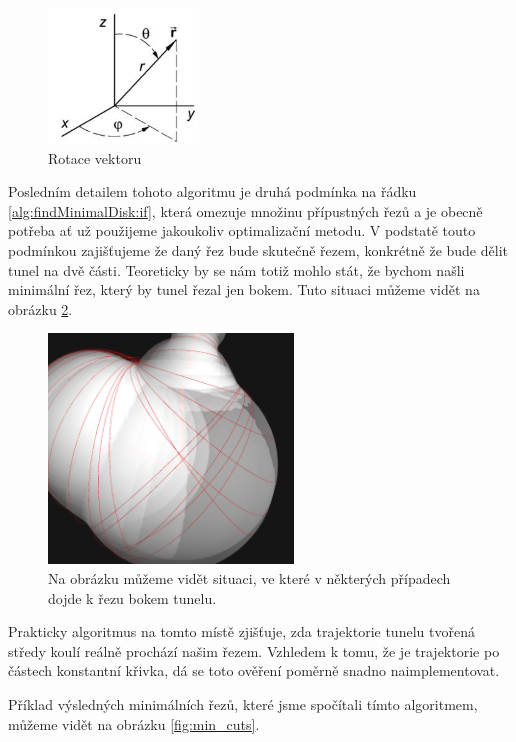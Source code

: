 \begin{figure}[ht]
    \centering
    \includegraphics[width=40mm]{img/vector_rotate.jpg}
    \caption{Rotace vektoru}
  \centering
  \label{fig:vector_rotate}
\end{figure}

Posledním detailem tohoto algoritmu je druhá podmínka na řádku \ref{alg:findMinimalDisk:if},
která omezuje množinu přípustných řezů a je obecně potřeba ať už použijeme
jakoukoliv optimalizační metodu. V podstatě touto podmínkou zajišťujeme že daný řez
bude skutečně řezem, konkrétně že bude dělit tunel na dvě části. Teoreticky by se nám
totiž mohlo stát, že bychom našli minimální řez, který by tunel řezal jen bokem.
Tuto situaci můžeme vidět na obrázku \ref{fig:side_cut}.

\begin{figure}[ht]
    \centering
    \includegraphics[width=65mm]{img/side_cut.png}
    \caption{Na obrázku můžeme vidět situaci, ve které v některých případech dojde
        k řezu bokem tunelu.}
  \centering
  \label{fig:side_cut}
\end{figure}

Prakticky algoritmus na tomto místě zjišťuje, zda trajektorie tunelu tvořená středy
koulí reálně prochází našim řezem. Vzhledem k tomu, že je trajektorie po částech
konstantní křivka, dá se toto ověření poměrně snadno naimplementovat.

Příklad výsledných minimálních řezů, které jsme spočítali tímto algoritmem,
můžeme vidět na obrázku \ref{fig:min_cuts}.

